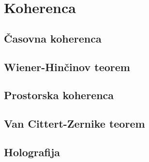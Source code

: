 
\chapter{Koherenca}
 
\section{Časovna koherenca}
\section{Wiener-Hinčinov teorem}
\section{Prostorska koherenca}
\section{Van Cittert-Zernike teorem}
\section{Holografija}
